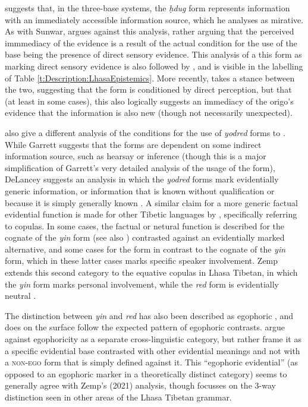  suggests that, in the three-base systems, the \textit{ḥdug} form represents information with an immediately accessible information source, which he analyses as mirative. As with Sunwar,  argues against this analysis, rather arguing that the perceived immmediacy of the evidence is a result of the actual condition for the use of the base being the presence of direct sensory evidence. This analysis of a this form as marking direct sensory evidence is also followed by , and is visible in the labelling of Table \ref{t:Description:LhasaEpistemics}. More recently,  takes a stance between the two, suggesting that the form is conditioned by direct perception, but that (at least in some cases), this also logically suggests an immediacy of the origo's evidence that the information is also new (though not necessarily unexpected).

 also give a different analysis of the conditions for the use of \textit{yodred} forms to . While Garrett suggests that the forms are dependent on some indirect information source, such as hearsay or inference (though this is a major simplification of Garrett's very detailed analysis of the usage of the form), DeLancey suggests an analysis in which the \textit{yodred} forms mark evidentially generic information, or information that is known without qualification or because it is simply generally known \cite[392]{DeLancey2017Tibetan}. A similar claim for a more generic factual evidential function is made for other Tibetic languages by , specifically referring to copulas. In some cases, the factual or netural function is described for the cognate of the \textit{yin} form (see also ) contrasted against an evidentially marked alternative, and some cases for the form in contrast to the cognate of the \textit{yin} form, which in these latter cases marks specific speaker involvement. Zemp extends this second category to the equative copulas in Lhasa Tibetan, in which the \textit{yin} form marks personal involvement, while the \textit{red} form is evidentially neutral \cite[39]{Zemp2020}.

The distinction between \textit{yin} and \textit{red} has also been described as egophoric \cite{EgoIntro}, and does on the surface follow the expected pattern of egophoric contrasts.  argue against egophoricity as a separate cross-linguistic category, but rather frame it as a specific evidential base contrasted with other evidential meanings and not with a \textsc{non-ego} form that is simply defined against it. This ``egophoric evidential'' (as opposed to an egophoric marker in a theoretically distinct category) seems to generally agree with Zemp's (2021) analysis, though focusses on the 3-way distinction seen in other areas of the Lhasa Tibetan grammar. 

